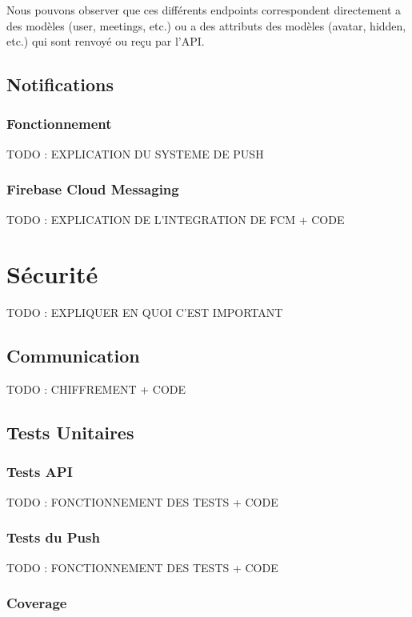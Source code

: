 \documentclass[french]{article}
\begin{document}
	Nous pouvons observer que ces différents endpoints correspondent directement a des modèles (user, meetings, etc.) ou a des attributs des modèles (avatar, hidden, etc.) qui sont renvoyé ou reçu par l'API. 
	
	\subsection{Notifications}
	\subsubsection{Fonctionnement}
	
	TODO : EXPLICATION DU SYSTEME DE PUSH
	
	\subsubsection{Firebase Cloud Messaging}
	
	TODO : EXPLICATION DE L'INTEGRATION DE FCM + CODE
	
	
	
	\section{Sécurité}
	
	TODO : EXPLIQUER EN QUOI C'EST IMPORTANT
	
	\subsection{Communication}
	
	TODO : CHIFFREMENT + CODE
	
	\subsection{Tests Unitaires}
	\subsubsection{Tests API}
	
	TODO : FONCTIONNEMENT DES TESTS + CODE
	
	\subsubsection{Tests du Push}
	
	TODO : FONCTIONNEMENT DES TESTS + CODE
	
	\subsubsection{Coverage}
	
\end{document}
